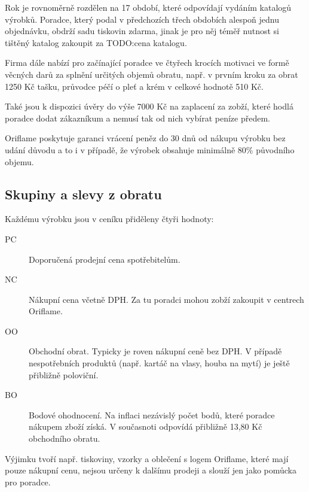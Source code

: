 \documentclass[a4wide,12pt]{report}
\begin{document}
Rok je rovnoměrně rozdělen na 17 období, které odpovídají vydáním katalogů výrobků. Poradce, který podal v předchozích třech obdobích alespoň jednu objednávku, obdrží sadu tiskovin zdarma, jinak je pro něj téměř nutnost si tištěný katalog zakoupit za TODO:cena katalogu.

Firma dále nabízí pro začínající poradce ve čtyřech krocích motivaci ve formě věcných darů za splnění určitých objemů obratu, např. v prvním kroku za obrat 1250 Kč tašku, průvodce péčí o pleť a krém v celkové hodnotě 510 Kč.

Také jsou k dispozici úvěry do výše 7000 Kč na zaplacení za zobží, které hodlá poradce dodat zákazníkum a nemusí tak od nich vybírat peníze předem.

Oriflame poskytuje garanci vrácení peněz do 30 dnů od nákupu výrobku bez udání důvodu a to i v případě, že výrobek obsahuje minimálně 80\% původního objemu.
\subsection{Skupiny a slevy z obratu}
Každému výrobku jsou v ceníku přiděleny čtyři hodnoty:
\begin{description}
\item[PC] Doporučená prodejní cena spotřebitelům.
\item[NC] Nákupní cena včetně DPH. Za tu poradci mohou zobží zakoupit v centrech Oriflame.
\item[OO] Obchodní obrat. Typicky je roven nákupní ceně bez DPH. V případě nespotřebních produktů (např. kartáč na vlasy, houba na mytí) je ještě přibližně poloviční.
\item[BO] Bodové ohodnocení. Na inflaci nezávislý počet bodů, které poradce nákupem zboží získá. V současnoti odpovídá přibližně 13,80 Kč obchodního obratu.
\end{description}
Výjimku tvoří např. tiskoviny, vzorky a oblečení s logem Oriflame, které mají pouze nákupní cenu,  nejsou určeny k dalšímu prodeji a slouží jen jako pomůcka pro poradce.
\end{document}
